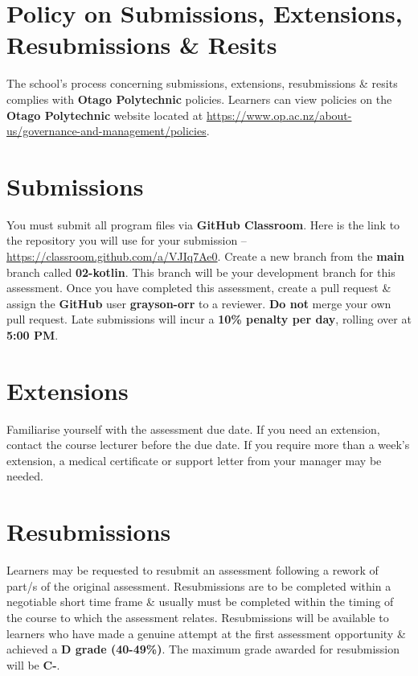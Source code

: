 \documentclass{article}
\begin{document}
\section*{Policy on Submissions, Extensions, Resubmissions \& Resits}
The school's process concerning submissions, extensions, resubmissions \& resits complies with \textbf{Otago Polytechnic} policies. Learners can view policies on the \textbf{Otago Polytechnic} website located at \href{https://www.op.ac.nz/about-us/governance-and-management/policies}{https://www.op.ac.nz/about-us/governance-and-management/policies}.

\section*{Submissions}
You must submit all program files via \textbf{GitHub Classroom}. Here is the link to the repository you will use for your submission – \href{https://classroom.github.com/a/VJIq7Ae0}{https://classroom.github.com/a/VJIq7Ae0}. Create a new branch from the \textbf{main} branch called \textbf{02-kotlin}. This branch will be your development branch for this assessment. Once you have completed this assessment, create a pull request \& assign the \textbf{GitHub} user \textbf{grayson-orr} to a reviewer. \textbf{Do not} merge your own pull request. Late submissions will incur a \textbf{10\% penalty per day}, rolling over at \textbf{5:00 PM}.

\section*{Extensions}
Familiarise yourself with the assessment due date. If you need an extension, contact the course lecturer before the due date. If you require more than a week's extension, a medical certificate or support letter from your manager may be needed.

\section*{Resubmissions}
Learners may be requested to resubmit an assessment following a rework of part/s of the original assessment. Resubmissions are to be completed within a negotiable short time frame \& usually must be completed within the timing of the course to which the assessment relates. Resubmissions will be available to learners who have made a genuine attempt at the first assessment opportunity \& achieved a \textbf{D grade (40-49\%)}. The maximum grade awarded for resubmission will be \textbf{C-}.
\end{document}
